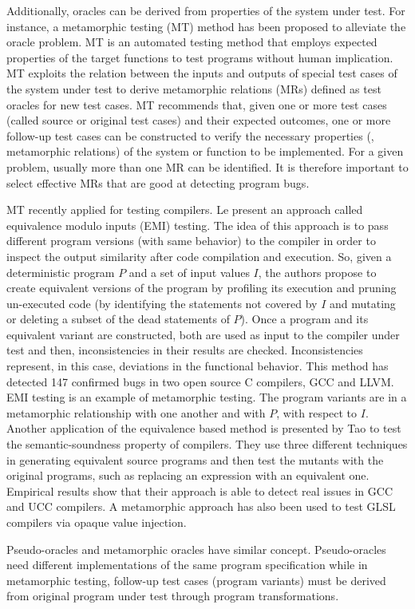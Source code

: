 \begin{itemize}
	Additionally, oracles can be derived from properties of the system under test. For instance, a metamorphic testing (MT) method has been proposed to alleviate the oracle problem\cite{chen2004case}. MT is an automated testing method that employs expected properties of the target functions to test programs without human implication. 
	MT exploits the relation between the inputs and outputs of special test cases of the system under test to derive metamorphic relations (MRs) defined as test oracles for new test cases. 
	MT recommends that, given one or more test cases (called source or original test cases) and their expected outcomes, one or more follow-up test cases can be constructed to verify the necessary properties (\ie, metamorphic relations) of the system or function to be implemented.
	For a given problem, usually more than one MR can be identified. It is therefore important to select effective MRs that are good at detecting program bugs.

	MT  recently applied for testing compilers. Le \etal\cite{le2014compiler} present an approach called equivalence modulo inputs (EMI) testing. The idea of this approach is to pass different program versions (with same behavior) to the compiler in order to inspect the output similarity after code compilation and execution. So, given a deterministic program $P$ and a set of input values $I$, the authors propose to create equivalent versions of the program by profiling its execution and pruning un-executed code (by identifying the statements not covered by $I$ and mutating or deleting a subset of the dead statements of $P$).
	Once a program and its equivalent variant are constructed, both are used as input to the compiler under test and then, inconsistencies in their results are checked. Inconsistencies represent, in this case, deviations in the functional behavior.
	This method has detected \num{147} confirmed bugs in two open source C compilers, GCC and LLVM.
	EMI testing is an example of metamorphic testing. The program variants are in a metamorphic relationship with one another and with $P$, with respect to $I$.
	Another application of the equivalence based method is presented by Tao \etal\cite{tao2010automatic} to test the semantic-soundness property of compilers. They use three different techniques in generating equivalent source programs and then test the mutants with the original programs, such as replacing an expression with an equivalent one. Empirical results show that their approach is able to detect real issues in GCC and UCC compilers.
	A metamorphic approach has also been used to test GLSL compilers via opaque value injection\cite{donaldson2016metamorphic}.
	
	Pseudo-oracles and metamorphic oracles have similar concept. Pseudo-oracles need different implementations of the same program specification while in metamorphic testing, follow-up test cases (program variants) must be derived from original program under test through program transformations.
	

	
	
\end{itemize}


